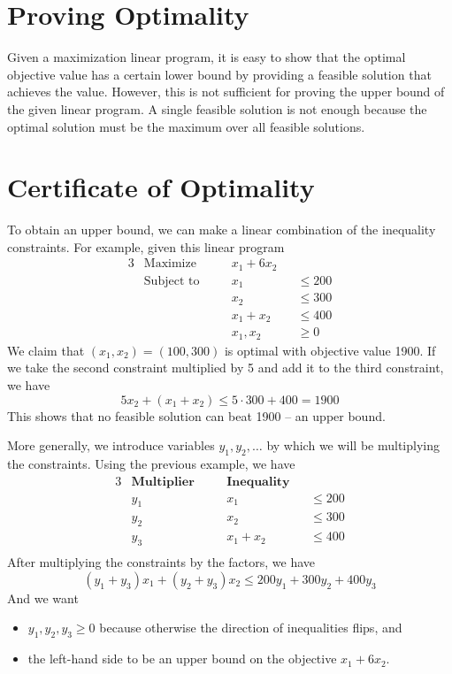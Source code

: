 \section{Proving Optimality}

Given a maximization linear program, it is easy to show that the optimal objective value has a certain lower bound by providing a feasible solution that achieves the value. However, this is not sufficient for proving the upper bound of the given linear program. A single feasible solution is not enough because the optimal solution must be the maximum over all feasible solutions.

\section{Certificate of Optimality}

To obtain an upper bound, we can make a linear combination of the inequality constraints. For example, given this linear program
\begin{alignat*}{3}
    &\text{Maximize} \quad && x_1 + 6x_2 \\
    &\text{Subject to} \quad && x_1 &&\leq 200 \\
                    & &&  x_2 &&\leq 300 \\
                    & &&  x_1 + x_2 &&\leq 400 \\
                    & &&  x_1,x_2 &&\geq 0
\end{alignat*}
We claim that $(x_1,x_2) = (100, 300)$ is optimal with objective value 1900. If we take the second constraint multiplied by 5 and add it to the third constraint, we have
$$
5x_2 + (x_1+x_2) \leq 5 \cdot 300 + 400 = 1900
$$
This shows that no feasible solution can beat 1900 -- an upper bound.

More generally, we introduce variables $y_1,y_2,\ldots$ by which we will be multiplying the constraints. Using the previous example, we have
\begin{alignat*}{3}
    &\textbf{Multiplier} \quad && \textbf{Inequality} \\
    & y_1 \quad && x_1 &&\leq 200 \\
    & y_2 \quad &&  x_2 &&\leq 300 \\
    & y_3 \quad && x_1 + x_2 &&\leq 400 \\
\end{alignat*}
After multiplying the constraints by the factors, we have
$$
(y_1+y_3)x_1 + (y_2 + y_3)x_2 \leq 200 y_1 + 300 y_2 + 400 y_3
$$
And we want
\begin{itemize}
    \item $y_1,y_2,y_3 \geq 0$ because otherwise the direction of inequalities flips, and
    \item the left-hand side to be an upper bound on the objective $x_1 + 6x_2$.
\end{itemize}

